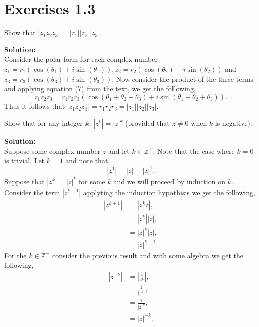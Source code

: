 \documentclass[12pt]{article}
\makeatletter
\theoremstyle{homework}
\newenvironment{exercise}[1]
{\def\@currentlabel{#1}\exercisecore}
{\endexercisecore}
\newcommand{\localhead}[1]{\par\smallskip\noindent\textbf{#1}\nobreak\\}%
\newcommand\solution{\localhead{Solution:}}
\makeatother
\begin{document}
\section*{Exercises 1.3}

\begin{exercise}{2} Show that $|z_1z_2z_3| = |z_1||z_2||z_3|$.\\
    \solution Consider the polar form for each complex number $z_1 = r_1( \cos(\theta_1) + i \sin(\theta_1)), z_2 = r_2( \cos(\theta_2) + i \sin(\theta_2))$ and $z_3 = r_3( \cos(\theta_3) + i \sin(\theta_3))$.
    Now consider the product of the three terms and applying equation (7) from the text, we get the following, 
    \begin{equation*}
        z_1z_2z_3 = r_1r_2r_3\left(\cos(\theta_1 + \theta_ 2 +\theta_3) + i \sin(\theta_1 + \theta_ 2 +\theta_3)\right).
    \end{equation*} 
    Thus it follows that $|z_1z_2z_3| = r_1r_2r_3 =  |z_1||z_2||z_3|$. 
\end{exercise}
\vspace{.5in}


\begin{exercise}{4} Show that for any integer $k$. $|z^k| = |z|^k$ (provided that $z \neq 0$ when $k$ is negative).\\
    \solution Suppose some complex number $z$ and let $k \in \mathbb{Z}^+$. Note that the case where $k = 0$ is trivial. Let $k = 1$ and note that, 
    \begin{equation*}
        |z^1| = |z| = |z|^1.
    \end{equation*}
    Suppose that $|z^k| = |z|^k$ for some $k$ and we will proceed by induction on $k$. Consider the term $|z^{k+1}|$ applyting the induction hypothisis we get the following, 
    \begin{align*}
        |z^{k + 1}| &= |z^{k}z|,\\
        &= |z^{k}||z|,\\ 
        &= |z|^{k}|z|,\\
        &= |z|^{k+1}.
    \end{align*}
    For the  $k \in \mathbb{Z}^-$ consider the previous result and with some algebra we get the following, 
    \begin{align*}
        |z^{-k}| &= |\frac{1}{z^k}|,\\
         &= \frac{1}{|z^k|},\\
         &= \frac{1}{|z|^k},\\
         &= |z|^{-k}.
    \end{align*}
\end{exercise}
\vspace{.5in}
\end{document}
